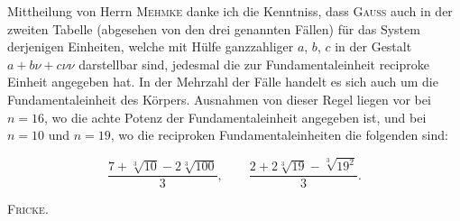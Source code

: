  Mittheilung von Herrn \textsc{Mehmke} danke ich die Kenntniss, dass \textsc{Gauss} auch in der
zweiten Tabelle (abgesehen von den drei genannten Fällen) für das System
derjenigen Einheiten, welche mit Hülfe ganzzahliger $a$, $b$, $c$ in der
Gestalt $a+b\nu+c\nu\nu$ darstellbar sind, jedesmal die zur
Fundamentaleinheit reciproke Einheit angegeben hat. In der Mehrzahl der
Fälle handelt es sich auch um die Fundamentaleinheit des Körpers.
Ausnahmen von dieser Regel liegen vor bei $n=16$, wo die achte Potenz der
Fundamentaleinheit angegeben ist, und bei $n=10$ und $n=19$, wo die
reciproken Fundamentaleinheiten die folgenden sind:

\[
\frac{7+\sqrt[3]{10}-2\sqrt[3]{100}}{3}, \qquad
\frac{2+2\sqrt[3]{19}-\sqrt[3]{19^2}}{3}.
\]

\par\noindent\hfill\textsc{Fricke.}\par\endgroup
